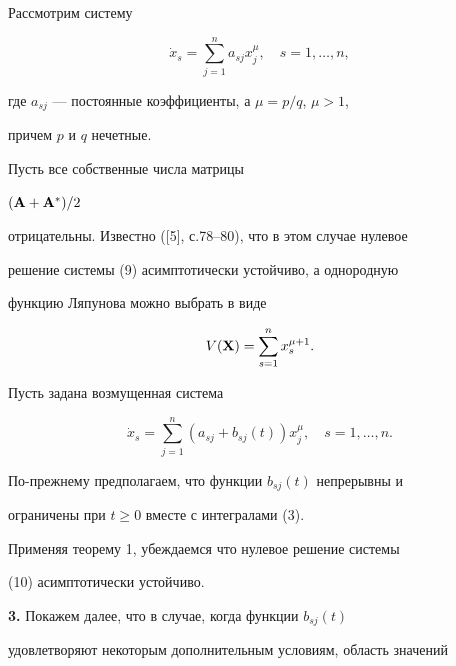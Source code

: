 \begin{exam} Рассмотрим систему 


\begin{equation} 


\Dot x_s=\sum^n_{j=1}a_{sj}x^\mu_j,\quad s=1,\dotsc,n, 


\end{equation} 


где $a_{sj}$ --- постоянные коэффициенты, а $\mu=p/q$, $\mu>1$, 


причем $p$ и $q$ нечетные. 


 


Пусть все собственные числа матрицы 


$(\bold A+\bold A^*)/2$ 


отрицательны. Известно ([5], с.78--80), что в этом случае нулевое 


решение системы (9) асимптотически устойчиво, а однородную 


функцию Ляпунова можно выбрать в виде 


$$ 


V(\bx)=\sum^n_{s=1}x^{\mu+1}_s. 


$$ 


 


Пусть задана возмущенная система 


\begin{equation} 


\Dot x_s=\sum^n_{j=1}(a_{sj}+b_{sj}(t))x^\mu_j,\quad 


s=1,\dotsc,n. 


\end{equation} 


По-прежнему предполагаем, что функции $b_{sj}(t)$ непрерывны и 


ограничены при $t\ge 0$ вместе с интегралами (3). 


 


Применяя теорему 1, убеждаемся что нулевое решение системы 


(10) асимптотически устойчиво. 


\end{exam} 


 


{\bf 3.} Покажем далее, что в случае, когда функции $b_{sj}(t)$ 


удовлетворяют некоторым дополнительным условиям, область значений 


